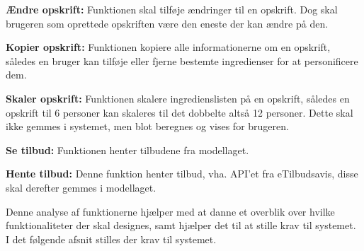 \textbf{Ændre opskrift:} Funktionen skal tilføje ændringer til en opskrift. Dog skal brugeren som oprettede opskriften være den eneste der kan ændre på den. 

\textbf{Kopier opskrift:} Funktionen kopiere alle informationerne om en opskrift, således en bruger kan tilføje eller fjerne bestemte ingredienser for at personificere dem.

\textbf{Skaler opskrift:} Funktionen skalere ingredienslisten på en opskrift, således en opskrift til 6 personer kan skaleres til det dobbelte altså 12 personer. Dette skal ikke gemmes i systemet, men blot beregnes og vises for brugeren.		

\textbf{Se tilbud:} Funktionen henter tilbudene fra modellaget.

\textbf{Hente tilbud:} Denne funktion henter tilbud, vha. API'et fra eTilbudsavis, disse skal derefter gemmes i modellaget.


Denne analyse af funktionerne hjælper med at danne et overblik over hvilke funktionaliteter der skal designes, samt hjælper det til at stille krav til systemet.
I det følgende afsnit stilles der krav til systemet.

